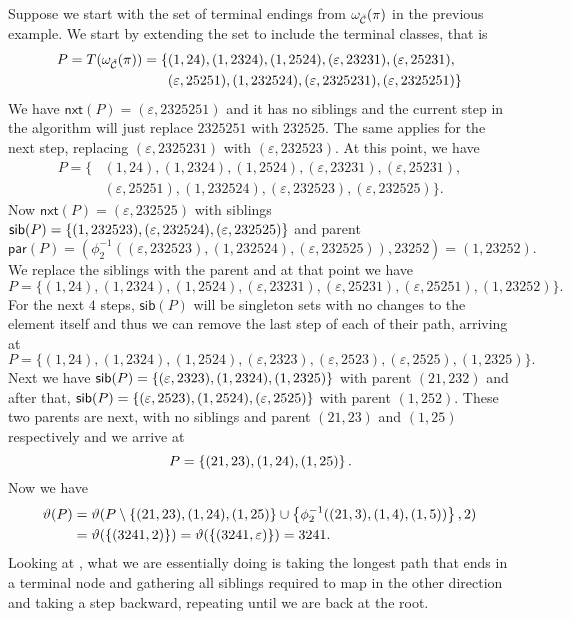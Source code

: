 Suppose we start with the set of terminal endings from $\omega_{\check{\mathcal{C}}}(\pi)$ in the previous example. We start by extending the set to include the terminal classes, that is
\begin{align*}
    P = T(\omega_{\check{\mathcal{C}}}(\pi)) = \{&(1,24), (1,2324), (1,2524), (\varepsilon,23231), (\varepsilon,25231),\\ &(\varepsilon,25251), (1,232524), (\varepsilon,2325231), (\varepsilon,2325251)\}
\end{align*}
We have $\textsf{nxt}(P) = (\varepsilon,2325251)$ and it has no siblings and the current step in the algorithm will just replace $2325251$ with $232525$. The same applies for the next step, replacing $(\varepsilon,2325231)$ with $(\varepsilon,232523)$. At this point, we have
\begin{align*}
    P = \{&(1,24), (1,2324), (1,2524), (\varepsilon,23231), (\varepsilon,25231),\\ &(\varepsilon,25251), (1,232524), (\varepsilon,232523), (\varepsilon,232525)\}.
\end{align*}
Now $\textsf{nxt}(P) = (\varepsilon,232525)$ with siblings $\textsf{sib}(P) = \left\{(1,232523), (\varepsilon,232524), (\varepsilon,232525)\right\}$ and parent
\[
    \textsf{par}(P) = (\phi_2^{-1}((\varepsilon, 232523),(1, 232524),(\varepsilon, 232525)), 23252) = (1,23252).
\]
We replace the siblings with the parent and at that point we have
\[
    P = \{(1,24), (1,2324), (1,2524), (\varepsilon,23231), (\varepsilon,25231),(\varepsilon,25251), (1,23252)\}.
\]
For the next $4$ steps, $\textsf{sib}(P)$ will be singleton sets with no changes to the element itself and thus we can remove the last step of each of their path, arriving at
\[
    P = \{(1,24), (1,2324), (1,2524), (\varepsilon,2323), (\varepsilon,2523),(\varepsilon,2525), (1,2325)\}.
\]
Next we have $\textsf{sib}(P) = \left\{(\varepsilon, 2323), (1, 2324), (1,2325)\right\}$ with parent $(21,232)$ and after that, $\textsf{sib}(P) = \left\{(\varepsilon, 2523), (1, 2524), (\varepsilon,2525)\right\}$ with parent $(1,252)$. These two parents are next, with no siblings and parent $(21,23)$ and $(1,25)$ respectively and we arrive at 
\[
    P = \left\{(21,23),(1,24),(1,25)\right\}.
\]
Now we have
\begin{align*}
    \vartheta(P) &= \vartheta(P \setminus \left\{(21,23),(1,24),(1,25)\right\} \cup \left\{\phi_2^{-1}((21,3),(1,4),(1,5))\right\}, 2)\\
    &= \vartheta(\left\{(3241,2)\right\}) = \vartheta(\left\{(3241,\varepsilon)\right\}) = 3241.
\end{align*}
Looking at , what we are essentially doing is taking the longest path that ends in a terminal node and gathering all siblings required to map in the other direction and taking a step backward, repeating until we are back at the root.

